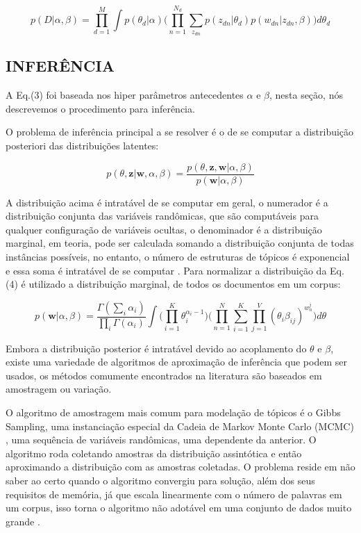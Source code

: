 \documentclass[12pt,a4paper]{article}
\begin{document}
  \begin{equation}
  p(D|\alpha,\beta)= \prod_{d=1}^{M} \int{p(\theta _d|\alpha)\Bigg(\prod_{n=1}^{N_d}\sum_{z_{dn}} p(z_{dn}|\theta _d)p(w_{dn}|z_{dn},\beta)\Bigg)d\theta _d}
  \end{equation}
  
  
  
  \subsection{INFERÊNCIA}
  A Eq.(3) foi baseada nos hiper parâmetros antecedentes $\alpha$ e $\beta$, nesta seção, nós descrevemos o procedimento para inferência.
  
  O problema de inferência principal a se resolver é o de se computar a distribuição posteriori das distribuições latentes:
  
  \begin{equation}
  p(\theta,\textbf{z}|\textbf{w},\alpha,\beta) = \frac{p(\theta,\textbf{z},\textbf{w}|\alpha,\beta)}{p(\textbf{w}|\alpha,\beta)}
  \end{equation}
  
  A distribuição acima é intratável de se computar em geral, o numerador é a distribuição conjunta das variáveis randômicas, que são computáveis para qualquer configuração de variáveis ocultas, o denominador é a distribuição marginal, em teoria, pode ser calculada somando a distribuição conjunta de todas instâncias possíveis, no entanto, o número de estruturas de tópicos é exponencial e essa soma é intratável de se computar \cite{blei2012probabilistic}. Para normalizar a distribuição da Eq.(4) é utilizado a distribuição marginal, de todos os documentos em um corpus:
  
  \begin{equation}
  p(\textbf{w}|\alpha,\beta)=\frac{\Gamma(\sum_{i}\alpha_i)}{\prod_{i}\Gamma(\alpha_i)}\int{\Bigg(\prod_{i=1}^{K}\theta_i^{\alpha_i-1}\Bigg)} \Bigg(\prod_{n=1}^{N}\sum_{i=1}^{K}\prod_{j=1}^{V}(\theta_i\beta_{ij})^{w_n^j}\Bigg)d\theta
  \end{equation}
  
  Embora a distribuição posterior é intratável devido ao acoplamento do $\theta$ e $\beta$, existe uma variedade de algoritmos de aproximação de inferência que podem ser usados, os métodos comumente encontrados na literatura são baseados em amostragem ou variação.
  
  O algoritmo de amostragem mais comum para modelação de tópicos é o Gibbs Sampling, uma instanciação especial da Cadeia de Markov Monte Carlo (MCMC) \cite{jordan1999introduction}, uma sequência de variáveis randômicas, uma dependente da anterior. O algoritmo roda coletando amostras da distribuição assintótica e então aproximando a distribuição com as amostras coletadas. O problema reside em não saber ao certo  quando o algoritmo convergiu para solução, além dos seus requisitos de memória, já que escala linearmente com o número de palavras em um corpus, isso torna o algoritmo não adotável em uma conjunto de dados muito grande \cite{vrehuuvrek2011scalability}.
  
\end{document}
